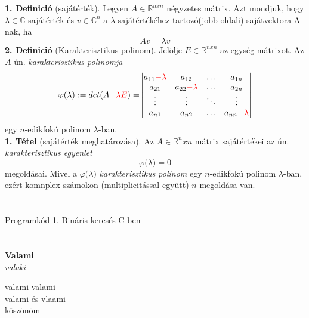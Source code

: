 \documentclass[11pt]{book}
\newenvironment{vers}[2]{\begin{center}\textbf{#1}\\ \textit{#2}\\ \end{center}}{\vspace{2 pt}}
\begin{document}
\chapter{}
\textbf{1. Definició}
(sajátérték). Legyen $A\in{\mathbb{R}}^{nxn}$ négyzetes mátrix. Azt mondjuk, hogy 
$\lambda \in{\mathbb{C}}$ sajátérték és $v\in{\mathbb{C}^{n}}$ a $\lambda$ sajátértékéhez tartozó(jobb oldali) sajátvektora A-nak, ha \[Av = \lambda v\]
\textbf{2. Definició} (Karakterisztikus polinom). Jelölje $E\in{\mathbb{R}}^{nxn}$ az egység mátrixot. Az $A$ ún. \textit{karakterisztikus polinomja}
\[\varphi{(}\lambda{) := det(A}\color{red}{-}\lambda{E}\color{black}{) = }
\begin{vmatrix}
a_{11}\color{red}{-}\lambda\color{black} & a_{12} & \hdots & a_{1n} \\
a_{21} & a_{22}\color{red}{-}\lambda\color{black} & \hdots & a_{2n} \\
\vdots & \vdots & \ddots & \vdots \\
a_{n1} & a_{n2} & \hdots & a_{nn}\color{red}{-}\lambda
\end{vmatrix}\]
egy $n$-edikfokú polinom $\lambda$-ban.\\
\textbf{1. Tétel} (sajátérték meghatározása). Az $A\in{\mathbb{R}^nxn}$ mátrix sajátértékei az ún. \textit{karakterisztikus egyenlet}
\[\varphi{(}\lambda{) = 0}\]
megoldásai. Mivel a $\varphi{(}\lambda{)}$ \textit{karakterisztikus polinom} egy $n$-edikfokú polinom $\lambda$-ban, ezért komnplex számokon (multiplicitással együtt) $n$ megoldása van.

\newpage
\chapter{}
\hulipsum[1-2]
\center Programkód 1. Bináris keresés C-ben
\setlength{\fboxsep}{0pt}\fbox{}

\newpage
\chapter{}
\begin{vers}{Valami}{valaki}
valami valami \\
valami és vlaami \\
köszönöm
\end{vers}
\end{document}

